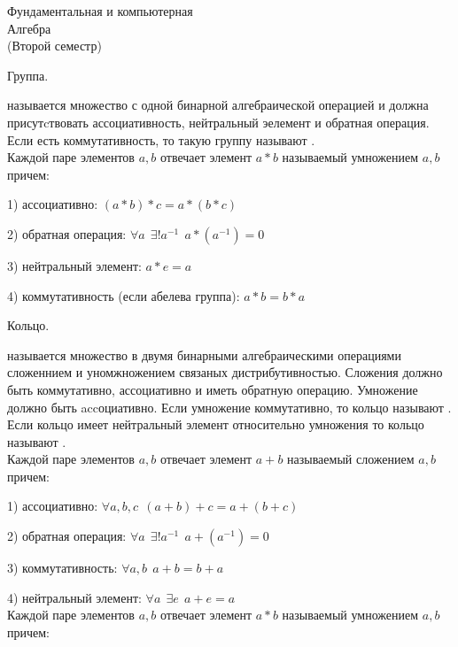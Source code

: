 
\begin{title}
  Фундаментальная и компьютерная \\
  Алгебра\\
  (Второй семестр) \\
\end{title}

\begin{title}[\Large]
  Группа.
\end{title}

   называется множество с одной бинарной алгебраической операцией и
должна присутcтвовать ассоциативность, нейтральный эелемент и обратная операция.
Если есть коммутативность, то такую группу называют .\\

  Каждой паре элементов $a,b$ отвечает элемент $a*b$ называемый умножением $a,b$
причем:

1) ассоциативно: $(a*b)*c = a*(b*c)$

2) обратная операция: $\forall a ~~ \exists ! a^{-1} ~~ a * (a^{-1}) = 0$

3) нейтральный элемент: $a*e = a$

4) коммутативность (если абелева группа): $a*b = b*a$

\begin{title}[\Large]
  Кольцо.
\end{title}

   называется множество в двумя бинарными алгебраическими операциями
сложеннием и уномжножением связаных дистрибутивностью. Сложения должно быть
коммутативно, ассоциативно и иметь обратную операцию. Умножение должно быть
accоциативно. Если умножение коммутативно, то кольцо называют . Если кольцо имеет нейтральный элемент относительно умножения то
кольцо называют .\\

  Каждой паре элементов $a,b$ отвечает элемент $a+b$ называемый сложением $a,b$
причем:

1) ассоциативно: $\forall a,b,c ~~ (a+b)+c = a+(b+c)$

2) обратная операция: $\forall a ~~ \exists ! a^{-1} ~~ a + (a^{-1}) = 0$

3) коммутативность: $\forall a,b ~~ a+b = b+a$

4) нейтральный элемент: $\forall a ~~ \exists e ~~ a+e = a$\\

  Каждой паре элементов $a,b$ отвечает элемент $a*b$ называемый умножением $a,b$
причем:

